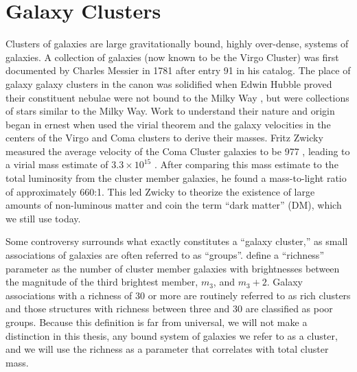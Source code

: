 \section{Galaxy Clusters}
Clusters of galaxies are large gravitationally bound, highly over-dense, systems of galaxies. A collection of galaxies (now known to be the Virgo Cluster) was first documented by Charles Messier in 1781 after entry 91 in his catalog. The place of galaxy galaxy clusters in the canon was solidified when Edwin Hubble proved their constituent nebulae were not bound to the Milky Way \citep{Hubble1926}, but were collections of stars similar to the Milky Way. Work to understand their nature and origin began in ernest when \cite{Hubble1931} used the virial theorem and the galaxy velocities in the centers of the Virgo \citep{Smith1936} and Coma \citep{Zwicky1933} clusters to derive their masses. Fritz Zwicky measured the average velocity of the Coma Cluster galaxies to be 977 \kms, leading to a virial mass estimate of $3.3 \times 10^{15}$ \Msol. After comparing this mass estimate to the total luminosity from the cluster member galaxies, he found a mass-to-light ratio of approximately 660:1. This led Zwicky to theorize the existence of large amounts of non-luminous matter and coin the term ``dark matter'' (DM), which we still use today.  

Some controversy surrounds what exactly constitutes a ``galaxy cluster,'' as small associations of galaxies are often referred to as ``groups''. \cite{Abell1958} define a ``richness'' parameter as the number of cluster member galaxies with brightnesses between the magnitude of the third brightest member, $m_3$, and $m_3 + 2$. Galaxy associations with a richness of 30 or more are routinely referred to as rich clusters and those structures with richness between three and 30 are classified as poor groups. Because this definition is far from universal, we will not make a distinction in this thesis, any bound system of galaxies we refer to as a cluster, and we will use the richness as a parameter that correlates with total cluster mass.


